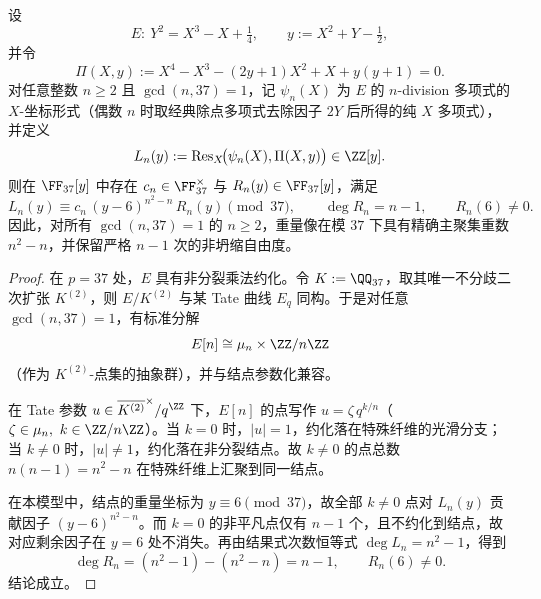\begin{theorem}\label{con:xi-terminal-zm-elliptic-odd-torsion-mod37-collapse-exponent}\label{thm:xi-terminal-zm-elliptic-full-order-torsion-mod37-collapse}
设
\[
E:\ Y^{2}=X^{3}-X+\tfrac14,
\qquad
y:=X^{2}+Y-\tfrac12,
\]
并令
\[
\Pi(X,y):=X^{4}-X^{3}-(2y+1)X^{2}+X+y(y+1)=0.
\]
对任意整数 \(n\ge 2\) 且 \(\gcd(n,37)=1\)，记 \(\psi_n(X)\) 为 \(E\) 的 \(n\)-division 多项式的 \(X\)-坐标形式（偶数 \(n\) 时取经典除点多项式去除因子 \(2Y\) 后所得的纯 \(X\) 多项式），并定义
\[
L_n(y):=\operatorname{Res}_{X}\!\bigl(\psi_n(X),\Pi(X,y)\bigr)\in\ZZ[y].
\]
则在 \(\FF_{37}[y]\) 中存在 \(c_n\in\FF_{37}^{\times}\) 与 \(R_n(y)\in\FF_{37}[y]\)，满足
\[
L_n(y)\equiv c_n\,(y-6)^{n^{2}-n}\,R_n(y)\pmod{37},
\qquad
\deg R_n=n-1,
\qquad
R_n(6)\neq 0.
\]
因此，对所有 \(\gcd(n,37)=1\) 的 \(n\ge 2\)，重量像在模 \(37\) 下具有精确主聚集重数 \(n^{2}-n\)，并保留严格 \(n-1\) 次的非坍缩自由度。
\end{theorem}
\begin{proof}
在 \(p=37\) 处，\(E\) 具有非分裂乘法约化。令 \(K:=\QQ_{37}\)，取其唯一不分歧二次扩张 \(K^{(2)}\)，则 \(E/K^{(2)}\) 与某 Tate 曲线 \(E_q\) 同构。于是对任意 \(\gcd(n,37)=1\)，有标准分解
\[
E[n]\cong \mu_n\times \ZZ/n\ZZ
\]
（作为 \(K^{(2)}\)-点集的抽象群），并与结点参数化兼容。

在 Tate 参数 \(u\in \overline{K^{(2)}}^{\times}/q^{\ZZ}\) 下，\(E[n]\) 的点写作 \(u=\zeta\,q^{k/n}\)（\(\zeta\in\mu_n,\ k\in\ZZ/n\ZZ\)）。当 \(k=0\) 时，\(|u|=1\)，约化落在特殊纤维的光滑分支；当 \(k\neq 0\) 时，\(|u|\neq 1\)，约化落在非分裂结点。故 \(k\neq 0\) 的点总数 \(n(n-1)=n^{2}-n\) 在特殊纤维上汇聚到同一结点。

在本模型中，结点的重量坐标为 \(y\equiv 6\pmod{37}\)，故全部 \(k\neq 0\) 点对 \(L_n(y)\) 贡献因子 \((y-6)^{n^{2}-n}\)。而 \(k=0\) 的非平凡点仅有 \(n-1\) 个，且不约化到结点，故对应剩余因子在 \(y=6\) 处不消失。再由结果式次数恒等式 \(\deg L_n=n^{2}-1\)，得到
\[
\deg R_n=(n^{2}-1)-(n^{2}-n)=n-1,
\qquad
R_n(6)\neq 0.
\]
结论成立。
\end{proof}


